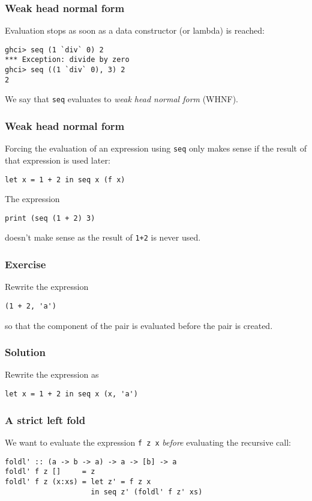 \documentclass{beamer}
\begin{document}
\begin{frame}[fragile]
  \frametitle{Weak head normal form}

  Evaluation stops as soon as a data constructor (or lambda) is
  reached:
  \begin{verbatim}
ghci> seq (1 `div` 0) 2
*** Exception: divide by zero
ghci> seq ((1 `div` 0), 3) 2
2
  \end{verbatim}
  We say that \lstinline!seq! evaluates to \emph{weak head normal
    form} (WHNF).
\end{frame}

\begin{frame}[fragile]
  \frametitle{Weak head normal form}

  Forcing the evaluation of an expression using \lstinline!seq! only
  makes sense if the result of that expression is used later:
  \begin{lstlisting}
let x = 1 + 2 in seq x (f x)
  \end{lstlisting}

  The expression
  \begin{lstlisting}
print (seq (1 + 2) 3)
  \end{lstlisting}
  doesn't make sense as the result of \lstinline!1+2! is never used.
\end{frame}

\begin{frame}[fragile]
  \frametitle{Exercise}

  Rewrite the expression
\begin{lstlisting}
(1 + 2, 'a')
\end{lstlisting}
so that the component of the pair is evaluated before the pair is
created.
\end{frame}

\begin{frame}[fragile]
  \frametitle{Solution}

  Rewrite the expression as
  \begin{lstlisting}
let x = 1 + 2 in seq x (x, 'a')
  \end{lstlisting}
\end{frame}

\begin{frame}[fragile]
  \frametitle{A strict left fold}

  We want to evaluate the expression \lstinline!f z x! \emph{before}
  evaluating the recursive call:

  \begin{lstlisting}
foldl' :: (a -> b -> a) -> a -> [b] -> a
foldl' f z []     = z
foldl' f z (x:xs) = let z' = f z x
                    in seq z' (foldl' f z' xs)
  \end{lstlisting}
\end{frame}
\end{document}
